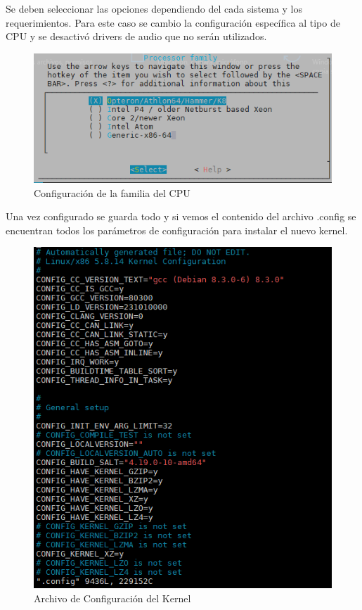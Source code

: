 \documentclass[12pt]{article}
\begin{document}
Se deben seleccionar las opciones dependiendo del cada sistema y los requerimientos. Para este caso se cambio la configuración específica al tipo de CPU y se desactivó drivers de audio que no serán utilizados.

\begin{figure}[!h]
   \centering
   \includegraphics[scale=.40]{imgs/conf_kernel3.png}
   \caption{Configuración de la familia del CPU}
   \label{fig4}
\end{figure}

Una vez configurado se guarda todo y si vemos el contenido del archivo .config se encuentran todos los parámetros de configuración para instalar el nuevo kernel.

\begin{figure}[!h]
   \centering
   \includegraphics[scale=.39]{imgs/conf_kernel.png}
   \caption{Archivo de Configuración del Kernel}
   \label{fig5}
\end{figure}
\end{document}
